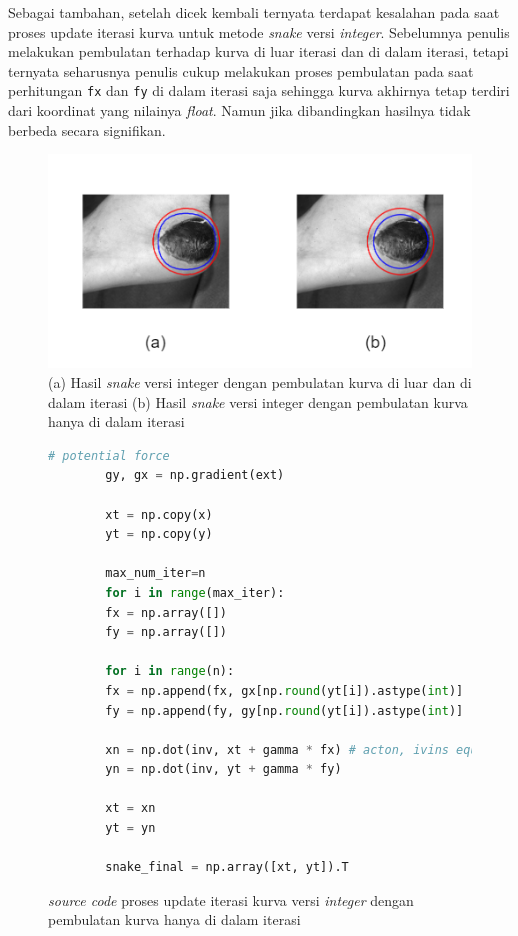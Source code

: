 Sebagai tambahan, setelah dicek kembali ternyata terdapat kesalahan pada saat proses update iterasi kurva untuk metode \emph{snake} versi \emph{integer}. Sebelumnya penulis melakukan pembulatan terhadap kurva di luar iterasi dan di dalam iterasi, tetapi ternyata seharusnya penulis cukup melakukan proses pembulatan pada saat perhitungan \texttt{fx} dan \texttt{fy} di dalam iterasi saja sehingga kurva akhirnya tetap terdiri dari koordinat yang nilainya \emph{float}. Namun jika dibandingkan hasilnya tidak berbeda secara signifikan.
\begin{figure}[H]
	\centering
	\includegraphics[width=1\textwidth]{gambar/compare_int}
	\caption{(a) Hasil \emph{snake} versi integer dengan pembulatan kurva di luar dan di dalam iterasi  (b) Hasil \emph{snake} versi integer dengan pembulatan kurva hanya di dalam iterasi}
	\label{Gambar:compare_int}
\end{figure}

\begin{figure}[H]
	\begin{lstlisting}[language=Python, basicstyle=\tiny]
		# potential force
		gy, gx = np.gradient(ext)
		
		xt = np.copy(x)
		yt = np.copy(y)
		
		max_num_iter=n
		for i in range(max_iter):
		fx = np.array([])
		fy = np.array([])
		
		for i in range(n):
		fx = np.append(fx, gx[np.round(yt[i]).astype(int)] [np.round(xt[i]).astype(int)] )
		fy = np.append(fy, gy[np.round(yt[i]).astype(int)] [np.round(xt[i]).astype(int)] )
		
		xn = np.dot(inv, xt + gamma * fx) # acton, ivins equation
		yn = np.dot(inv, yt + gamma * fy)
		
		xt = xn
		yt = yn
		
		snake_final = np.array([xt, yt]).T
	\end{lstlisting}
	\caption{\emph{source code} proses update iterasi kurva versi \emph{integer} dengan pembulatan kurva hanya di dalam iterasi}
	\label{code:snake_evol_int_2}
\end{figure}


